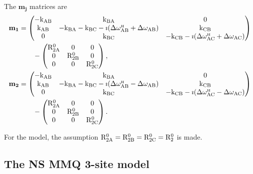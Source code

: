 The $\mathbf{m_j}$ matrices are
\begin{subequations}
\begin{align}
    \mathbf{m_1} &= \begin{pmatrix}
                        -\textrm{k}_\textrm{AB}   & \textrm{k}_\textrm{BA}                                  & 0    \\
                        \textrm{k}_\textrm{AB}    & -\textrm{k}_\textrm{BA} -\textrm{k}_\textrm{BC} -\imath(\Delta\omega^{\scriptscriptstyle\mathrm{H}}_\textrm{AB} + \Delta\omega_\textrm{AB})   & \textrm{k}_\textrm{CB} \\
                        0       & \textrm{k}_\textrm{BC}                                  & - \textrm{k}_\textrm{CB}  -\imath(\Delta\omega^{\scriptscriptstyle\mathrm{H}}_\textrm{AC} + \Delta\omega_\textrm{AC})
                    \end{pmatrix}  \nonumber \\
                 &\qquad - \begin{pmatrix}
                               \mathrm{R}_\mathrm{2A}^0 & 0          & 0    \\
                               0          & \mathrm{R}_\mathrm{2B}^0 & 0    \\
                               0          & 0          & \mathrm{R}_\mathrm{2C}^0
                           \end{pmatrix}, \\
    \mathbf{m_2} &= \begin{pmatrix}
                        -\textrm{k}_\textrm{AB}   & \textrm{k}_\textrm{BA}                                  & 0    \\
                        \textrm{k}_\textrm{AB}    & -\textrm{k}_\textrm{BA} -\textrm{k}_\textrm{BC} -\imath(\Delta\omega^{\scriptscriptstyle\mathrm{H}}_\textrm{AB} - \Delta\omega_\textrm{AB})   & \textrm{k}_\textrm{CB} \\
                        0       & \textrm{k}_\textrm{BC}                                  & -\textrm{k}_\textrm{CB} -\imath(\Delta\omega^{\scriptscriptstyle\mathrm{H}}_\textrm{AC} - \Delta\omega_\textrm{AC})
                    \end{pmatrix}  \nonumber \\
                 &\qquad - \begin{pmatrix}
                               \mathrm{R}_\mathrm{2A}^0 & 0          & 0    \\
                               0          & \mathrm{R}_\mathrm{2B}^0 & 0    \\
                               0          & 0          & \mathrm{R}_\mathrm{2C}^0
                           \end{pmatrix}.
\end{align}
\end{subequations}

For the model, the assumption $\mathrm{R}_\mathrm{2A}^0 = \mathrm{R}_\mathrm{2B}^0 = \mathrm{R}_\mathrm{2C}^0 = \mathrm{R}_2^0$ is made.



\subsection{The NS MMQ 3-site model}
\label{sect: dispersion: NS MMQ 3-site model}


